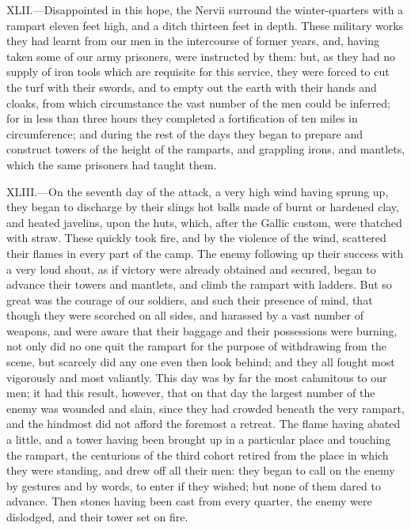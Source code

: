 XLII.—Disappointed in this hope, the Nervii surround the winter-quarters
with a rampart eleven feet high, and a ditch thirteen feet in
depth. These military works they had learnt from our men in the
intercourse of former years, and, having taken some of our army
prisoners, were instructed by them: but, as they had no supply of iron
tools which are requisite for this service, they were forced to cut the
turf with their swords, and to empty out the earth with their hands and
cloaks, from which circumstance the vast number of the men could be
inferred; for in less than three hours they completed a fortification of
ten miles in circumference; and during the rest of the days they began
to prepare and construct towers of the height of the ramparts, and
grappling irons, and mantlets, which the same prisoners had taught them.

XLIII.—On the seventh day of the attack, a very high wind having sprung
up, they began to discharge by their slings hot balls made of burnt or
hardened clay, and heated javelins, upon the huts, which, after the
Gallic custom, were thatched with straw. These quickly took fire, and by
the violence of the wind, scattered their flames in every part of the
camp. The enemy following up their success with a very loud shout, as if
victory were already obtained and secured, began to advance their towers
and mantlets, and climb the rampart with ladders. But so great was the
courage of our soldiers, and such their presence of mind, that though
they were scorched on all sides, and harassed by a vast number of
weapons, and were aware that their baggage and their possessions were
burning, not only did no one quit the rampart for the purpose of
withdrawing from the scene, but scarcely did any one even then look
behind; and they all fought most vigorously and most valiantly. This day
was by far the most calamitous to our men; it had this result, however,
that on that day the largest number of the enemy was wounded and slain,
since they had crowded beneath the very rampart, and the hindmost did
not afford the foremost a retreat. The flame having abated a little, and
a tower having been brought up in a particular place and touching the
rampart, the centurions of the third cohort retired from the place in
which they were standing, and drew off all their men: they began to call
on the enemy by gestures and by words, to enter if they wished; but none
of them dared to advance. Then stones having been cast from every
quarter, the enemy were dislodged, and their tower set on fire.

